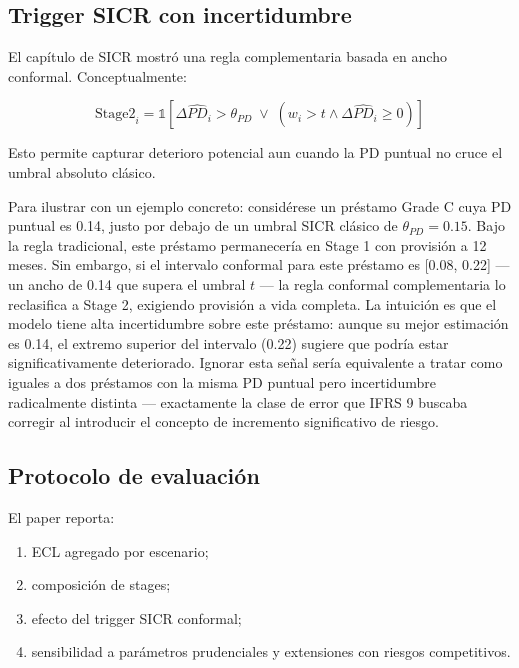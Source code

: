 \documentclass[
  spanish,
  11pt,
  letterpaper,
]{scrbook}
\providecommand{\tightlist}{%
  \setlength{\itemsep}{0pt}\setlength{\parskip}{0pt}}
\theoremstyle{plain}
\theoremstyle{remark}
\begin{document}
\subsection{Trigger SICR con
incertidumbre}\label{trigger-sicr-con-incertidumbre}

El capítulo de SICR mostró una regla complementaria basada en ancho
conformal. Conceptualmente:

\[
\mathrm{Stage2}_i=\mathbb{1}\left[\Delta \widehat{PD}_i>\theta_{PD}\;\lor\;(w_i>t \wedge \Delta \widehat{PD}_i \ge 0)\right]
\]

Esto permite capturar deterioro potencial aun cuando la PD puntual no
cruce el umbral absoluto clásico.

Para ilustrar con un ejemplo concreto: considérese un préstamo Grade C
cuya PD puntual es 0.14, justo por debajo de un umbral SICR clásico de
\(\theta_{PD} = 0.15\). Bajo la regla tradicional, este préstamo
permanecería en Stage 1 con provisión a 12 meses. Sin embargo, si el
intervalo conformal para este préstamo es {[}0.08, 0.22{]} --- un ancho
de 0.14 que supera el umbral \(t\) --- la regla conformal complementaria
lo reclasifica a Stage 2, exigiendo provisión a vida completa. La
intuición es que el modelo tiene alta incertidumbre sobre este préstamo:
aunque su mejor estimación es 0.14, el extremo superior del intervalo
(0.22) sugiere que podría estar significativamente deteriorado. Ignorar
esta señal sería equivalente a tratar como iguales a dos préstamos con
la misma PD puntual pero incertidumbre radicalmente distinta ---
exactamente la clase de error que IFRS 9 buscaba corregir al introducir
el concepto de incremento significativo de riesgo.

\subsection{Protocolo de evaluación}\label{protocolo-de-evaluaciuxf3n}

El paper reporta:

\begin{enumerate}
\def\labelenumi{\arabic{enumi}.}
\tightlist
\item
  ECL agregado por escenario;
\item
  composición de stages;
\item
  efecto del trigger SICR conformal;
\item
  sensibilidad a parámetros prudenciales y extensiones con riesgos
  competitivos.
\end{enumerate}
\end{document}
